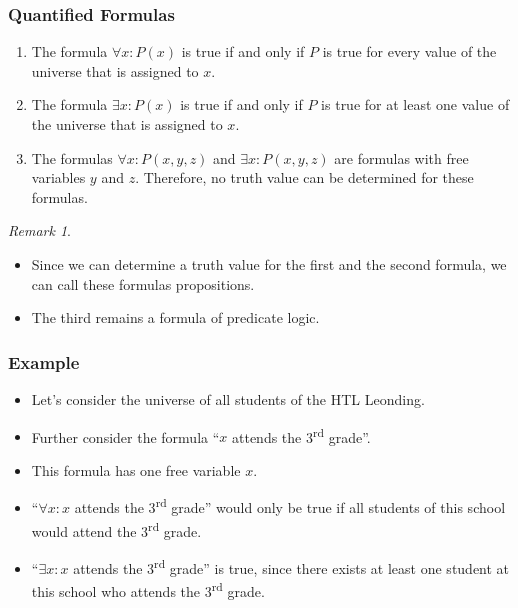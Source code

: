 \documentclass{beamer}
\theoremstyle{remark}
\newtheorem{remark}[theorem]{Remark}
\begin{document}
\begin{frame}
\frametitle{Quantified Formulas}
\begin{enumerate}
	\item The formula $\forall x: P(x)$ is true if and only if $P$ is true for every value of the universe that is assigned to $x$.
	\pause
	\item The formula $\exists x: P(x)$ is true if and only if $P$ is true for at least one value of the universe that is assigned to $x$.
	\pause
	\item The formulas $\forall x: P(x, y, z)$ and $\exists x: P(x, y, z)$ are formulas with free variables $y$ and $z$. Therefore, no
	truth value can be determined for these formulas.
\end{enumerate}
\pause
\begin{remark}
\begin{itemize}
	\item Since we can determine a truth value for the first and the second formula, we can call these formulas propositions.
	\pause
	\item The third remains a formula of predicate logic.
\end{itemize}
\end{remark}
\end{frame}

\begin{frame}
 \frametitle{Example}
 \begin{example}
 
\begin{itemize}
	\item Let's consider the universe of all students of the HTL Leonding.
        \item Further consider the formula ``$x$ attends the 3\textsuperscript{rd} grade''.
	\pause
	\item This formula has one free variable $x$.
	\pause
	\item ``$\forall x: $$x$ attends the 3\textsuperscript{rd} grade'' would only be true if all students of this school would attend the 3\textsuperscript{rd} grade.
	\item ``$\exists x: $$x$ attends the 3\textsuperscript{rd} grade'' is true, since there exists at least one student at this school who attends the 3\textsuperscript{rd} grade.
\end{itemize}
\end{example}
\end{frame}
\end{document}
